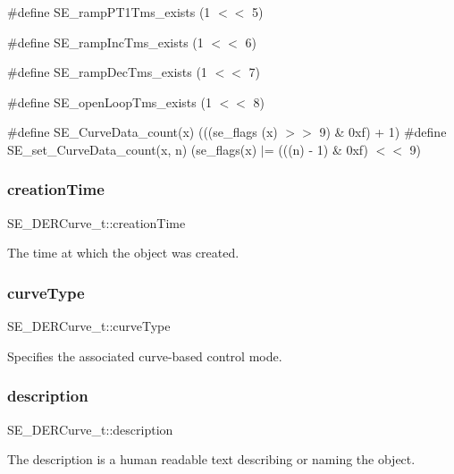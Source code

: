 \#define S\+E\+\_\+ramp\+P\+T1\+Tms\+\_\+exists (1 $<$$<$ 5)

\#define S\+E\+\_\+ramp\+Inc\+Tms\+\_\+exists (1 $<$$<$ 6)

\#define S\+E\+\_\+ramp\+Dec\+Tms\+\_\+exists (1 $<$$<$ 7)

\#define S\+E\+\_\+open\+Loop\+Tms\+\_\+exists (1 $<$$<$ 8)

\#define S\+E\+\_\+\+Curve\+Data\+\_\+count(x) (((se\+\_\+flags (x) $>$$>$ 9) \& 0xf) + 1) \#define S\+E\+\_\+set\+\_\+\+Curve\+Data\+\_\+count(x, n) (se\+\_\+flags(x) $\vert$= (((n) -\/ 1) \& 0xf) $<$$<$ 9) \mbox{\label{group__DERCurve_gaa955e114839f61826bb2fb4adabb5923}} 
\subsubsection{\texorpdfstring{creation\+Time}{creationTime}}
{\footnotesize\ttfamily S\+E\+\_\+\+D\+E\+R\+Curve\+\_\+t\+::creation\+Time}

The time at which the object was created. \mbox{\label{group__DERCurve_ga076f4efebdfbd4e6e2070fb9d8db7f4a}} 
\subsubsection{\texorpdfstring{curve\+Type}{curveType}}
{\footnotesize\ttfamily S\+E\+\_\+\+D\+E\+R\+Curve\+\_\+t\+::curve\+Type}

Specifies the associated curve-\/based control mode. \mbox{\label{group__DERCurve_ga895686dd6b59302a6afd6695d01db9d9}} 
\subsubsection{\texorpdfstring{description}{description}}
{\footnotesize\ttfamily S\+E\+\_\+\+D\+E\+R\+Curve\+\_\+t\+::description}

The description is a human readable text describing or naming the object. \mbox{\label{group__DERCurve_gae8312bc271b89dbee978056bd65b12bf}} 
